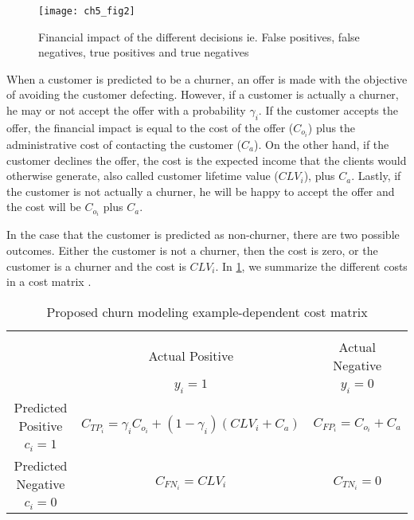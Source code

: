 	\begin{figure}[t]
	  \centering
    \texttt{[image: ch5\_fig2]}
	  \caption{Financial impact of the different decisions ie. False positives, false negatives, 
true 	positives and true negatives}
	  \label{fig:ch5:2}
	\end{figure}

	When a customer is predicted to be a churner, an offer is made with the objective of avoiding 
	the customer defecting. However, if a customer is actually a churner, he may or not accept the 
	offer with a probability $\gamma_i$. If the customer accepts the offer, the financial impact is 
	equal to the cost of the offer ($C_{o_i}$) plus the administrative cost of contacting the 
	customer ($C_a$). On the other hand, if the customer declines the offer, the cost is the 
expected 	income that the clients would otherwise generate, also called customer lifetime value 
($CLV_i$), 	plus $C_a$. Lastly, if the customer is not actually a churner, he will be happy to 
accept the 	offer and the cost will be $C_{o_i}$ plus $C_a$.
	
	In the case that the customer is predicted as non-churner, there are two possible outcomes. 
	Either the customer is not a churner, then the cost is zero, or the customer is a churner and the 
	cost is $CLV_i$. In \tablename{ \ref{tab:ch5:1}}, we summarize the different costs in a cost 
	matrix \citep{Elkan2001}.

  \begin{table}[t]
	  \centering
     \begin{tabular}{c|c|c}
        \multicolumn{3}{c}{}\\
			\multicolumn{1}{c|}{}  & Actual Positive& Actual Negative \\
			\multicolumn{1}{c|}{} & $y_i=1$& $y_i=0$ \\
			\hline
			Predicted Positive 		& \multirow{ 
2}{*}{$C_{TP_i}=\gamma_iC_{o_i}+(1-\gamma_i)(CLV_i+C_a)$} & 
\multirow{2}{*}{$C_{FP_i}=C_{o_i}+C_a$}\\
			$c_i=1$ & &\\
			\hline
			Predicted Negative  	& \multirow{ 2}{*}{$C_{FN_i}=CLV_i$} & \multirow{ 
			2}{*}{$C_{TN_i}=0$} \\
			$c_i=0$ & &\\
		\end{tabular}
		\caption{Proposed churn modeling example-dependent cost matrix}
    \label{tab:ch5:1}
  \end{table}

